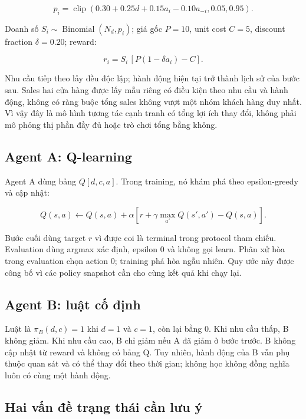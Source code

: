 \[p_i=\operatorname{clip}(0.30+0.25d+0.15a_i-0.10a_{-i},0.05,0.95).\]

Doanh số \(S_i\sim\operatorname{Binomial}(N_d,p_i)\); giá gốc \(P=10\),
unit cost \(C=5\), discount fraction \(\delta=0.20\); reward:

\[r_i=S_i\,[P(1-\delta a_i)-C].\]

Nhu cầu tiếp theo lấy đều độc lập; hành động hiện tại trở thành lịch sử
của bước sau. Sales hai cửa hàng được lấy mẫu riêng có điều kiện theo
nhu cầu và hành động, không có ràng buộc tổng sales không vượt một nhóm
khách hàng duy nhất. Vì vậy đây là mô hình tương tác cạnh tranh có tổng
lợi ích thay đổi, không phải mô phỏng thị phần đầy đủ hoặc trò chơi tổng
bằng không.

\subsection{Agent A: Q-learning}\label{agent-a-q-learning}

Agent A dùng bảng \(Q[d,c,a]\). Trong training, nó khám phá theo
epsilon-greedy và cập nhật:

\[Q(s,a)\leftarrow Q(s,a)+\alpha[r+\gamma\max_{a'}Q(s',a')-Q(s,a)].\]

Bước cuối dùng target \(r\) vì được coi là terminal trong protocol tham
chiếu. Evaluation dùng argmax xác định, epsilon 0 và không gọi learn.
Phân xử hòa trong evaluation chọn action 0; training phá hòa ngẫu nhiên.
Quy ước này được công bố vì các policy snapshot cần cho cùng kết quả khi
chạy lại.

\subsection{Agent B: luật cố
định}\label{agent-b-luux1eadt-cux1ed1-ux111ux1ecbnh}

Luật là \(\pi_B(d,c)=1\) khi \(d=1\) và \(c=1\), còn lại bằng 0. Khi nhu
cầu thấp, B không giảm. Khi nhu cầu cao, B chỉ giảm nếu A đã giảm ở bước
trước. B không cập nhật từ reward và không có bảng Q. Tuy nhiên, hành
động của B vẫn phụ thuộc quan sát và có thể thay đổi theo thời gian;
không học không đồng nghĩa luôn có cùng một hành động.

\subsection{Hai vấn đề trạng thái cần lưu
ý}\label{hai-vux1ea5n-ux111ux1ec1-trux1ea1ng-thuxe1i-cux1ea7n-lux1b0u-uxfd}

